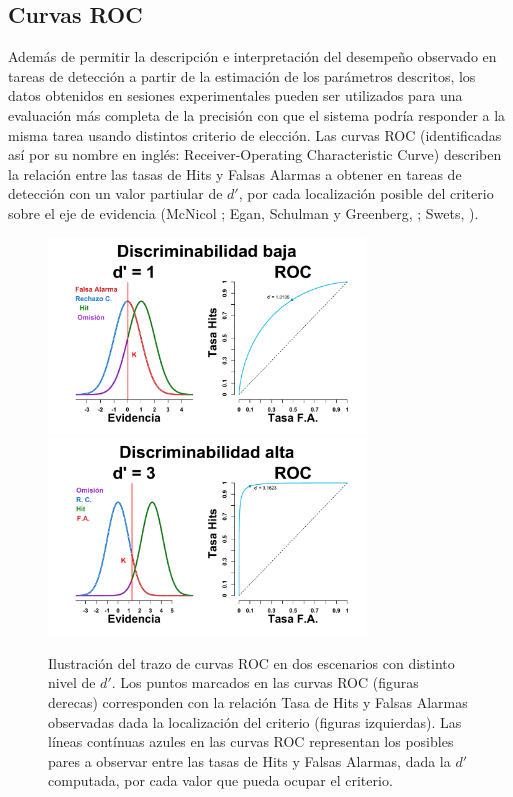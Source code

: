 \subsection{Curvas ROC}

Además de permitir la descripción e interpretación del desempeño observado en tareas de detección a partir de la estimación de los parámetros descritos, los datos obtenidos en sesiones experimentales pueden ser utilizados para una evaluación más completa de la precisión con que el sistema podría responder a la misma tarea usando distintos criterio de elección. Las curvas ROC (identificadas así por su nombre en inglés: Receiver-Operating Characteristic Curve) describen la relación entre las tasas de Hits y Falsas Alarmas a obtener en tareas de detección con un valor partiular de $d'$, por cada localización posible del criterio sobre el eje de evidencia (McNicol \citeyear{McNicol2}; Egan, Schulman y Greenberg, \citeyear{Egan1959}; Swets, \citeyear{Swets1973}).\\

\begin{figure}[h]
\centering
\includegraphics[width=0.75\textwidth]{Figures/ROC_2} \\
\includegraphics[width=0.75\textwidth]{Figures/ROC_3}\\
\caption[Trazo de curvas ROC]{Ilustración del trazo de curvas ROC en dos escenarios con distinto nivel de $d'$. Los puntos marcados en las curvas ROC (figuras derecas) corresponden con la relación Tasa de Hits y Falsas Alarmas observadas dada la localización del criterio (figuras izquierdas). Las líneas contínuas azules en las curvas ROC representan los posibles pares a observar entre las tasas de Hits y Falsas Alarmas, dada la $d'$ computada, por cada valor que pueda ocupar el criterio.}
\label{fig:Graf_ROC}
\end{figure}

